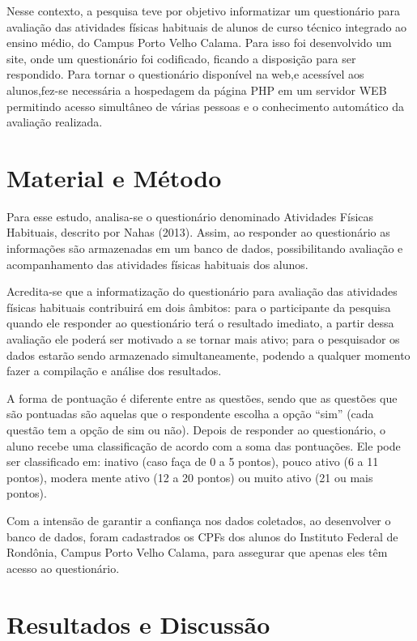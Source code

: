 \documentclass[article,12pt,onesidea,4paper,english,brazil,]{abntex2}
\begin{document}
Nesse contexto, a pesquisa teve por objetivo informatizar um questionário para avaliação das atividades físicas habituais de alunos de curso técnico integrado ao ensino médio, do Campus Porto Velho Calama. Para isso foi desenvolvido um site, onde um questionário foi codificado, ficando a disposição para ser respondido. Para tornar o questionário disponível na web,e acessível aos alunos,fez-se necessária a hospedagem da página PHP em um servidor WEB permitindo acesso simultâneo de várias pessoas e o conhecimento automático da avaliação realizada.

	
	\section*{Material e Método}
	
Para esse estudo, analisa-se o questionário denominado Atividades Físicas Habituais, descrito por Nahas (2013). Assim, ao responder ao questionário as informações são armazenadas em um banco de dados, possibilitando avaliação e acompanhamento das atividades físicas habituais dos alunos.

Acredita-se que a informatização do questionário para avaliação das atividades físicas habituais contribuirá em dois âmbitos: para o participante da pesquisa quando ele responder ao questionário terá o resultado imediato, a partir dessa avaliação ele poderá ser motivado a se tornar mais ativo; para o pesquisador os dados estarão sendo armazenado simultaneamente, podendo a qualquer momento fazer a compilação e análise dos resultados.

A forma de pontuação é diferente entre as questões, sendo que as questões que são pontuadas são aquelas que o respondente escolha a opção “sim” (cada questão tem a opção de sim ou não). Depois de responder ao questionário, o aluno recebe uma classificação de acordo com a soma das pontuações. Ele pode ser classificado em: inativo (caso faça de 0 a 5 pontos), pouco ativo (6 a 11 pontos), modera mente ativo (12 a 20 pontos) ou muito ativo (21 ou mais pontos).

Com a intensão de garantir a confiança nos dados coletados, ao desenvolver o banco de dados, foram cadastrados os CPFs dos alunos do Instituto Federal de Rondônia, Campus Porto Velho Calama, para assegurar que apenas eles têm acesso ao questionário.

	
	\section*{Resultados e Discussão}
	
\end{document}
